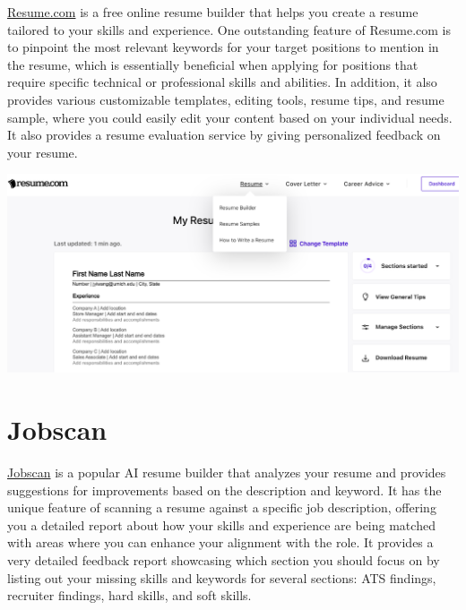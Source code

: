 \documentclass[
]{book}
\begin{document}
\href{https://www.resume.com/resume/builder/783ccdad-f0ea-4ff0-aa57-c59d6100995a}{Resume.com} is a free online resume builder that helps you create a resume tailored to your skills and experience. One outstanding feature of Resume.com is to pinpoint the most relevant keywords for your target positions to mention in the resume, which is essentially beneficial when applying for positions that require specific technical or professional skills and abilities. In addition, it also provides various customizable templates, editing tools, resume tips, and resume sample, where you could easily edit your content based on your individual needs. It also provides a resume evaluation service by giving personalized feedback on your resume.

\includegraphics[width=5.90625in,height=\textheight]{Resume.com pic.png}

\hypertarget{jobscan}{%
\section{Jobscan}\label{jobscan}}

\href{https://www.jobscan.co/resume-score}{Jobscan} is a popular AI resume builder that analyzes your resume and provides suggestions for improvements based on the description and keyword. It has the unique feature of scanning a resume against a specific job description, offering you a detailed report about how your skills and experience are being matched with areas where you can enhance your alignment with the role. It provides a very detailed feedback report showcasing which section you should focus on by listing out your missing skills and keywords for several sections: ATS findings, recruiter findings, hard skills, and soft skills.
\end{document}
